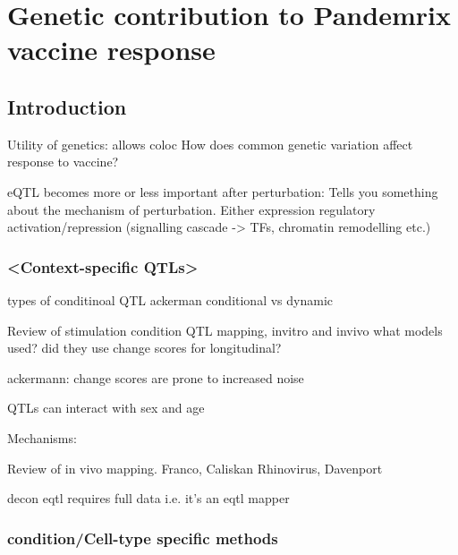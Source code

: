 %
%

\chapter{Genetic contribution to Pandemrix vaccine response}

\section{Introduction}

Utility of genetics:
allows coloc
How does common genetic variation affect response to vaccine?

eQTL becomes more or less important after perturbation: Tells you something about the mechanism of perturbation.
Either expression regulatory activation/repression (signalling cascade -> TFs, chromatin remodelling etc.)

\subsection{<Context-specific QTLs>}

types of conditinoal QTL
    ackerman conditional vs dynamic

Review of stimulation condition QTL mapping, invitro and invivo
what models used? did they use change scores for longitudinal?

ackermann: change scores are prone to increased noise

QTLs can interact with sex and age

Mechanisms: 

Review of in vivo mapping.
Franco, Caliskan Rhinovirus, Davenport

decon eqtl
    requires full data i.e. it's an eqtl mapper

\subsection{condition/Cell-type specific methods}

